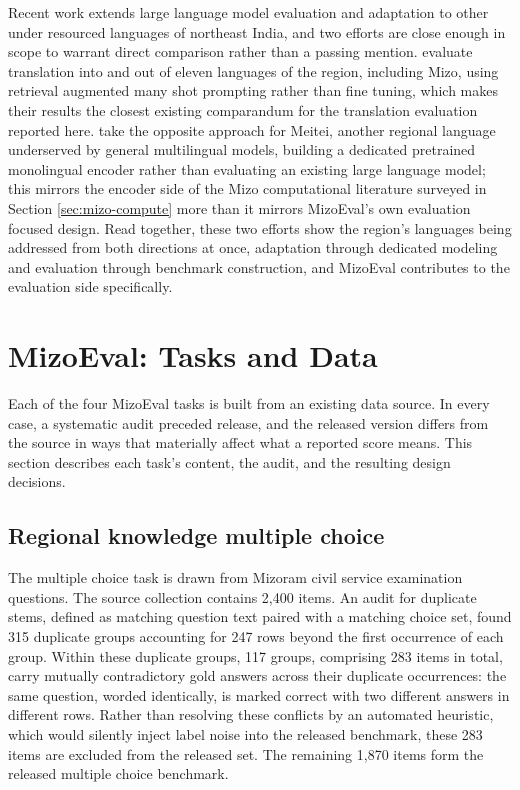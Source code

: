 \documentclass[11pt,a4paper]{article}
\begin{document}
Recent work extends large language model evaluation and adaptation to other under resourced languages of northeast India, and two efforts are close enough in scope to warrant direct comparison rather than a passing mention. \citet{dhawan2026bm25} evaluate translation into and out of eleven languages of the region, including Mizo, using retrieval augmented many shot prompting rather than fine tuning, which makes their results the closest existing comparandum for the translation evaluation reported here. \citet{nyalang2026meiteiroberta} take the opposite approach for Meitei, another regional language underserved by general multilingual models, building a dedicated pretrained monolingual encoder rather than evaluating an existing large language model; this mirrors the encoder side of the Mizo computational literature surveyed in Section \ref{sec:mizo-compute} more than it mirrors MizoEval's own evaluation focused design. Read together, these two efforts show the region's languages being addressed from both directions at once, adaptation through dedicated modeling and evaluation through benchmark construction, and MizoEval contributes to the evaluation side specifically.

\section{MizoEval: Tasks and Data}
\label{sec:data}

Each of the four MizoEval tasks is built from an existing data source. In every case, a systematic audit preceded release, and the released version differs from the source in ways that materially affect what a reported score means. This section describes each task's content, the audit, and the resulting design decisions.

\subsection{Regional knowledge multiple choice}
\label{sec:mcq-data}

The multiple choice task is drawn from Mizoram civil service examination questions. The source collection contains 2,400 items. An audit for duplicate stems, defined as matching question text paired with a matching choice set, found 315 duplicate groups accounting for 247 rows beyond the first occurrence of each group. Within these duplicate groups, 117 groups, comprising 283 items in total, carry mutually contradictory gold answers across their duplicate occurrences: the same question, worded identically, is marked correct with two different answers in different rows. Rather than resolving these conflicts by an automated heuristic, which would silently inject label noise into the released benchmark, these 283 items are excluded from the released set. The remaining 1,870 items form the released multiple choice benchmark.
\end{document}
